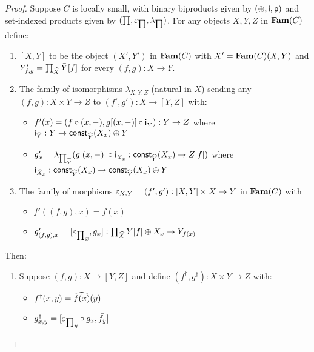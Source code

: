 \begin{proof}
Suppose $C$ is locally small, with binary biproducts given by $(\oplus,\mathsf{i},\mathsf{p})$ and set-indexed products
given by $(\prod,\varepsilon_{\prod},\lambda_{\prod})$. For any objects $X, Y, Z$ in $\mathbf{Fam}(C)$ define:

\begin{enumerate}
\item $[X, Y]$ to be the object $(X',Y')$ in $\mathbf{Fam}(C)$ with $X' = \mathbf{Fam}(C)(X,Y)$ and $Y'_{f,g} =
\prod_{\widehat{X}}\bar{Y}[f]$ for every $(f,g): X \to Y$.
\item The family of isomorphisms $\lambda_{X,Y,Z}$ (natural in $X$) sending any $(f, g): X \times Y \to Z$ to
$(f', g'): X \to [Y, Z]$ with:
\begin{itemize}
\item $f'(x) = (f \circ (x, -), g[(x,-)] \circ \mathsf{i}_{\bar{Y}}):
Y \to Z$ where $\mathsf{i}_{\bar{Y}}: \bar{Y} \to \mathsf{const}_{\widehat{Y}}(\bar{X}_x) \oplus \bar{Y}$
\item $g'_x = \lambda_{\prod_{\widehat{Y}}}(g[(x,-)] \circ \mathsf{i}_{\bar{X}_x}:
\mathsf{const}_{\widehat{Y}}(\bar{X}_x) \to \bar{Z}[f])$ where $\mathsf{i}_{\bar{X}_x}: \mathsf{const}_{\widehat{Y}}(\bar{X}_x)
\to \mathsf{const}_{\widehat{Y}}(\bar{X}_x) \oplus \bar{Y}$
\end{itemize}
\item The family of morphisms $\varepsilon_{X,Y} = (f',g'): [X, Y] \times X \to Y$ in $\mathbf{Fam}(C)$ with
\begin{itemize}
\item $f'((f, g), x) = f(x)$
\item $g'_{(f,g), x} = [{\varepsilon_{\prod}}_x, g_x]:
\prod_{\widehat{X}}\bar{Y}[f] \oplus \bar{X}_x \to \bar{Y}_{f(x)}$
\end{itemize}
\end{enumerate}

Then:

\begin{enumerate}
\item Suppose $(f,g): X \to [Y,Z]$ and define $(f^\dagger, g^\dagger): X \times Y \to Z$ with:
\begin{itemize}
\item $f^\dagger(x,y) = \widehat{f(x)}(y)$
\item $g^\dagger_{x,y} = [{\varepsilon_{\prod}}_y \circ g_x, \bar{f}_y]$
\end{itemize}


\end{enumerate}
\end{proof}
